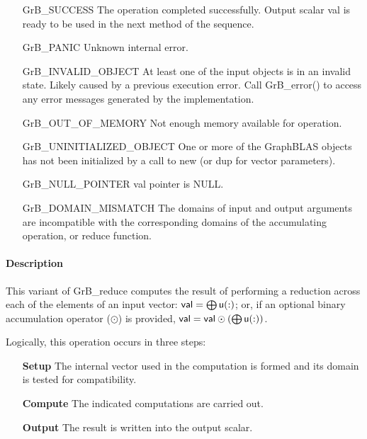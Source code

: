 \begin{itemize}[leftmargin=2.1in]
    \item[{\sf GrB\_SUCCESS}]         The operation completed
	    successfully. 
    Output scalar {\sf val} is ready to be used in the next method of 
    the sequence.

    \item[{\sf GrB\_PANIC}]            Unknown internal error.
    
    \item[{\sf GrB\_INVALID\_OBJECT}] At least one of the input objects is
	    in an invalid state. Likely caused by a previous execution error.
    Call {\sf GrB\_error()} to access 
    any error messages generated by the implementation.

    \item[{\sf GrB\_OUT\_OF\_MEMORY}]  Not enough memory available for operation.
    
    \item[{\sf GrB\_UNINITIALIZED\_OBJECT}] One or more of the GraphBLAS objects 
    has not been initialized by a call to {\sf new} (or {\sf dup} for vector
    parameters).
    
    \item[{\sf GrB\_NULL\_POINTER}]  {\sf val} pointer is {\sf NULL}.
    
    \item[{\sf GrB\_DOMAIN\_MISMATCH}]    The domains of input and output arguments are
	incompatible with the corresponding domains of the accumulating operation, 
     or reduce function.
\end{itemize}

\paragraph{Description}

This variant of {\sf GrB\_reduce} computes the result of performing
a reduction across each of the elements of an input vector:
${\sf val} = \bigoplus {\sf u}(:)$; 
or, if an optional binary accumulation 
operator ($\odot$) is provided, ${\sf val} = {\sf val} \odot (\bigoplus {\sf u}(:))$.  

Logically, this operation occurs in three steps:
\begin{enumerate}[leftmargin=0.75in]
\item[\bf Setup] The internal vector used in the computation is formed 
and its domain is tested for compatibility.
\item[\bf Compute] The indicated computations are carried out.
\item[\bf Output] The result is written into the output scalar.
\end{enumerate}

